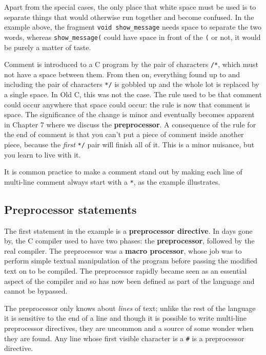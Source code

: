    Apart from the special cases, the only place that white space must be
    used is to separate things that would otherwise run together and become
    confused. In the example above, the fragment \texttt{void show\_message}
    needs space to separate the two words, whereas \texttt{show\_message(}
    could have space in front of the \texttt{(} or not, it would be purely
    a matter of taste.


   Comment is introduced to a C program by the pair of characters
    \texttt{/*}, which must not have a space between them. From then on,
    everything found up to and including the pair of characters \texttt{*/}
    is gobbled up and the whole lot is replaced by a single space. In Old C,
    this was not the case. The rule used to be that comment could occur
    anywhere that space could occur: the rule is now that comment is space. The
    significance of the change is minor and eventually becomes apparent in
    Chapter 7 where we discuss the \textbf{preprocessor}. A
    consequence of the rule for the end of comment is that you can't put a
    piece of comment inside another piece, because the \textit{first}
    \texttt{*/} pair will finish all of it. This is a minor nuisance, but
    you learn to live with it.


   It is common practice to make a comment stand out by making each line of
    multi-line comment always start with a \texttt{*}, as the example
    illustrates.


  

  \subsection{Preprocessor statements}
   

   The first statement in the example is a \textbf{preprocessor
    directive}. In days gone by, the C compiler used to have two phases:
    the \textbf{preprocessor}, followed by the real compiler. The
    preprocessor was a \textbf{macro processor}, whose job was to perform
    simple textual manipulation of the program before passing the modified text
    on to be compiled.  The preprocessor rapidly became seen as an essential
    aspect of the compiler and so has now been defined as part of the language
    and cannot be bypassed.


   The preprocessor only knows about \textit{lines} of text; unlike the rest
    of the language it is sensitive to the end of a line and though it is
    possible to write multi-line preprocessor directives, they are uncommon and
    a source of some wonder when they are found. Any line whose first visible
    character is a \texttt{\#} is a preprocessor directive.


